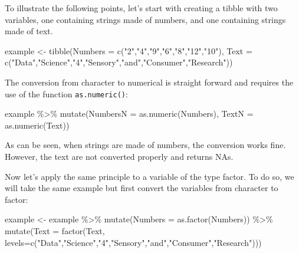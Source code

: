 \documentclass[
]{book}
\newenvironment{Shaded}{\begin{snugshade}}{\end{snugshade}}
\newcommand{\AttributeTok}[1]{\textcolor[rgb]{0.77,0.63,0.00}{#1}}
\newcommand{\FunctionTok}[1]{\textcolor[rgb]{0.00,0.00,0.00}{#1}}
\newcommand{\NormalTok}[1]{#1}
\newcommand{\OtherTok}[1]{\textcolor[rgb]{0.56,0.35,0.01}{#1}}
\newcommand{\SpecialCharTok}[1]{\textcolor[rgb]{0.00,0.00,0.00}{#1}}
\newcommand{\StringTok}[1]{\textcolor[rgb]{0.31,0.60,0.02}{#1}}
\begin{document}
To illustrate the following points, let's start with creating a tibble with two variables, one containing strings made of numbers, and one containing strings made of text.

\begin{Shaded}
\begin{Highlighting}[]
\NormalTok{example }\OtherTok{\textless{}{-}} \FunctionTok{tibble}\NormalTok{(}\AttributeTok{Numbers =} \FunctionTok{c}\NormalTok{(}\StringTok{"2"}\NormalTok{,}\StringTok{"4"}\NormalTok{,}\StringTok{"9"}\NormalTok{,}\StringTok{"6"}\NormalTok{,}\StringTok{"8"}\NormalTok{,}\StringTok{"12"}\NormalTok{,}\StringTok{"10"}\NormalTok{),}
                  \AttributeTok{Text =} \FunctionTok{c}\NormalTok{(}\StringTok{"Data"}\NormalTok{,}\StringTok{"Science"}\NormalTok{,}\StringTok{"4"}\NormalTok{,}\StringTok{"Sensory"}\NormalTok{,}\StringTok{"and"}\NormalTok{,}\StringTok{"Consumer"}\NormalTok{,}\StringTok{"Research"}\NormalTok{))}
\end{Highlighting}
\end{Shaded}

The conversion from character to numerical is straight forward and requires the use of the function \texttt{as.numeric()}:

\begin{Shaded}
\begin{Highlighting}[]
\NormalTok{example }\SpecialCharTok{\%\textgreater{}\%} 
  \FunctionTok{mutate}\NormalTok{(}\AttributeTok{NumbersN =} \FunctionTok{as.numeric}\NormalTok{(Numbers), }\AttributeTok{TextN =} \FunctionTok{as.numeric}\NormalTok{(Text))}
\end{Highlighting}
\end{Shaded}

As can be seen, when strings are made of numbers, the conversion works fine. However, the text are not converted properly and returns NAs.

Now let's apply the same principle to a variable of the type factor. To do so, we will take the same example but first convert the variables from character to factor:

\begin{Shaded}
\begin{Highlighting}[]
\NormalTok{example }\OtherTok{\textless{}{-}}\NormalTok{ example }\SpecialCharTok{\%\textgreater{}\%} 
  \FunctionTok{mutate}\NormalTok{(}\AttributeTok{Numbers =} \FunctionTok{as.factor}\NormalTok{(Numbers)) }\SpecialCharTok{\%\textgreater{}\%} 
  \FunctionTok{mutate}\NormalTok{(}\AttributeTok{Text =} \FunctionTok{factor}\NormalTok{(Text, }\AttributeTok{levels=}\FunctionTok{c}\NormalTok{(}\StringTok{"Data"}\NormalTok{,}\StringTok{"Science"}\NormalTok{,}\StringTok{"4"}\NormalTok{,}\StringTok{"Sensory"}\NormalTok{,}\StringTok{"and"}\NormalTok{,}\StringTok{"Consumer"}\NormalTok{,}\StringTok{"Research"}\NormalTok{)))}
\end{Highlighting}
\end{Shaded}
\end{document}

